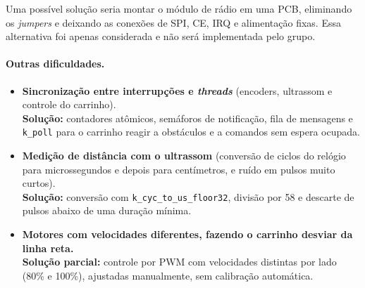 Uma possível solução seria montar o módulo de rádio em uma PCB, eliminando os \textit{jumpers} e deixando
as conexões de SPI, CE, IRQ e alimentação fixas. Essa alternativa foi apenas considerada e não será
implementada pelo grupo.
\paragraph{Outras dificuldades.}
\begin{itemize}
    \item \textbf{Sincronização entre interrupções e \textit{threads}} (encoders, ultrassom e controle do carrinho). \\
          \textbf{Solução:} contadores atômicos, semáforos de notificação, fila de mensagens e \texttt{k\_poll}
          para o carrinho reagir a obstáculos e a comandos sem espera ocupada.
    \item \textbf{Medição de distância com o ultrassom} (conversão de ciclos do relógio para microssegundos e depois para centímetros,
          e ruído em pulsos muito curtos). \\
          \textbf{Solução:} conversão com \texttt{k\_cyc\_to\_us\_floor32}, divisão por 58 e descarte de pulsos abaixo de
          uma duração mínima.
    \item \textbf{Motores com velocidades diferentes, fazendo o carrinho desviar da linha reta.} \\
          \textbf{Solução parcial:} controle por PWM com velocidades distintas por lado (80\% e 100\%),
          ajustadas manualmente, sem calibração automática.
\end{itemize}

